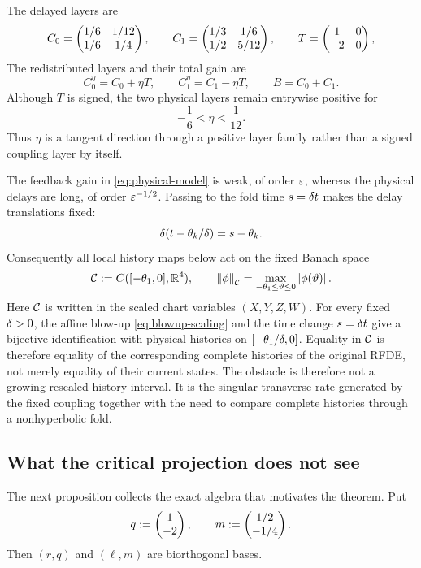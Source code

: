 The delayed layers are
\begin{equation}
\label{eq:delay-layers}
 C_0=\begin{pmatrix}1/6&1/12\\1/6&1/4\end{pmatrix},\qquad
 C_1=\begin{pmatrix}1/3&1/6\\1/2&5/12\end{pmatrix},\qquad
 T=\begin{pmatrix}1&0\\-2&0\end{pmatrix},
\end{equation}
The redistributed layers and their total gain are
\nopagebreak[4]
\begin{equation}
\label{eq:eta-layers}
 C_0^\eta=C_0+\eta T,\qquad
 C_1^\eta=C_1-\eta T,\qquad
 B=C_0+C_1.
\end{equation}
Although \(T\) is signed, the two physical layers remain entrywise positive
for
\begin{equation}
\label{eq:eta-positive}
 -\frac16<\eta<\frac1{12}.
\end{equation}
Thus \(\eta\) is a tangent direction through a positive layer family rather
than a signed coupling layer by itself.

The feedback gain in \cref{eq:physical-model} is weak, of order \(\varepsilon\),
whereas the physical delays are long, of order \(\varepsilon^{-1/2}\).  Passing to
the fold time \(s=\delta t\) makes the delay translations fixed:
\[
 \delta(t-\theta_k/\delta)=s-\theta_k.
\]
Consequently all local history maps below act on the fixed Banach space
\begin{equation}
\label{eq:history-space}
 \mathcal C:=C([ -\theta_1,0],\mathbb R^4),\qquad
 \left\lVert \phi\right\rVert_{\mathcal C}=\max_{-\theta_1\le\vartheta\le0}\left\lvert \phi(\vartheta)\right\rvert.
\end{equation}
Here \(\mathcal C\) is written in the scaled chart variables
\((X,Y,Z,W)\).  For every fixed \(\delta>0\), the affine blow-up
\cref{eq:blowup-scaling} and the time change \(s=\delta t\) give a
bijective identification with physical histories on
\([ -\theta_1/\delta,0]\).  Equality in \(\mathcal C\) is therefore equality of
the corresponding complete histories of the original RFDE, not merely
equality of their current states.
The obstacle is therefore not a growing rescaled history interval.  It is
the singular transverse rate generated by the fixed coupling together with
the need to compare complete histories through a nonhyperbolic fold.

\subsection{What the critical projection does not see}

The next proposition collects the exact algebra that motivates the theorem.
Put
\[
 q:=\begin{pmatrix}1\\-2\end{pmatrix},\qquad m:=\begin{pmatrix}1/2\\-1/4\end{pmatrix}.
\]
Then \((r,q)\) and \((\ell,m)\) are biorthogonal bases.

